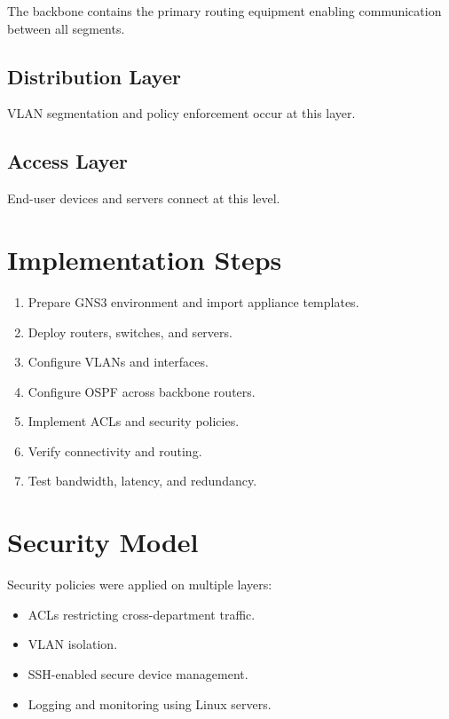 \documentclass[12pt,a4paper]{article}
\begin{document}
The backbone contains the primary routing equipment enabling communication between all segments.

\subsection{Distribution Layer}

VLAN segmentation and policy enforcement occur at this layer.

\subsection{Access Layer}

End-user devices and servers connect at this level.

\newpage

\section{Implementation Steps}

\begin{enumerate}
  \item Prepare GNS3 environment and import appliance templates.
  \item Deploy routers, switches, and servers.
  \item Configure VLANs and interfaces.
  \item Configure OSPF across backbone routers.
  \item Implement ACLs and security policies.
  \item Verify connectivity and routing.
  \item Test bandwidth, latency, and redundancy.
\end{enumerate}

\newpage

\section{Security Model}

Security policies were applied on multiple layers:

\begin{itemize}
  \item ACLs restricting cross-department traffic.
  \item VLAN isolation.
  \item SSH-enabled secure device management.
  \item Logging and monitoring using Linux servers.
\end{itemize}
\end{document}
